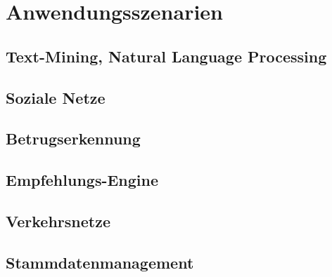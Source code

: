 \chapter{Anwendungsszenarien}
\section{Text-Mining, Natural Language Processing}
\section{Soziale Netze}
\section{Betrugserkennung}
\section{Empfehlungs-Engine}
\section{Verkehrsnetze}
\section{Stammdatenmanagement}
